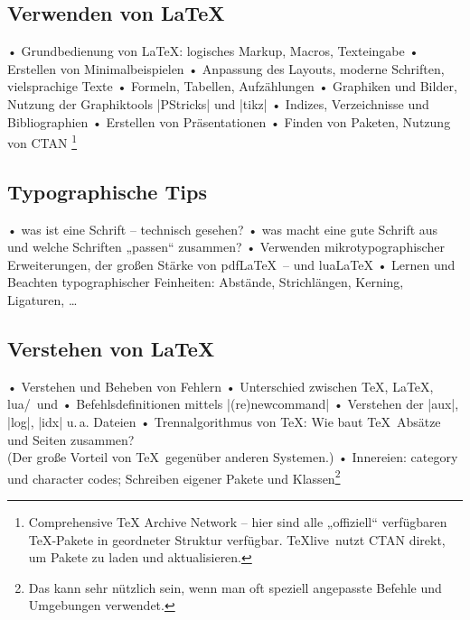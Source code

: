 \documentclass[12pt,ngerman]{scrartcl}
\newcommand{\TeXlive}{\TeX\textsf{live}\xspace}
\begin{document}
\subsection{Verwenden von \LaTeX}
\begin{itemize}
  • Grundbedienung von \LaTeX: logisches Markup, Macros, Texteingabe
  • Erstellen von Minimalbeispielen
  • Anpassung des Layouts, moderne Schriften, vielsprachige Texte
  • Formeln, Tabellen, Aufzählungen
  • Graphiken und Bilder, Nutzung der Graphiktools |PStricks| und |tikz|
  • Indizes, Verzeichnisse und Bibliographien
  • Erstellen von Präsentationen
  • Finden von Paketen, Nutzung von CTAN
\footnote{
  Comprehensive TeX Archive Network – hier sind alle „offiziell“ verfügbaren \TeX-Pakete in geordneter Struktur verfügbar. \TeXlive\ nutzt CTAN direkt, um Pakete zu laden und aktualisieren.}
\end{itemize}

\subsection{Typographische Tips}
\begin{itemize}
  • was ist eine Schrift – technisch gesehen?
  • was macht eine gute Schrift aus und welche Schriften „passen“ zusammen?
  • Verwenden mikrotypographischer Erweiterungen, der großen Stärke von pdf\LaTeX\ – und \textsf{lua}\LaTeX
  • Lernen und Beachten typographischer Feinheiten: Abstände, Strichlängen, Kerning,\\ Ligaturen, …
\end{itemize}

\subsection{Verstehen von \LaTeX}
\begin{itemize}
  • Verstehen und Beheben von Fehlern
  • Unterschied zwischen \TeX, \LaTeX, \textsf{lua}/\XeLaTeX\ und \ConTeXt
  • Befehlsdefinitionen mittels |(re)newcommand|
  • Verstehen der |aux|, |log|, |idx| u.\,a. Dateien
  • Trennalgorithmus von \TeX: Wie baut \TeX\ Absätze und Seiten zusammen?\\ (Der große Vorteil von \TeX\ gegenüber anderen Systemen.)
  • Innereien: category und character codes; Schreiben eigener Pakete und Klassen\footnote{Das kann sehr nützlich sein, wenn man oft speziell angepasste Befehle und Umgebungen verwendet.}
\end{itemize}
\end{document}
